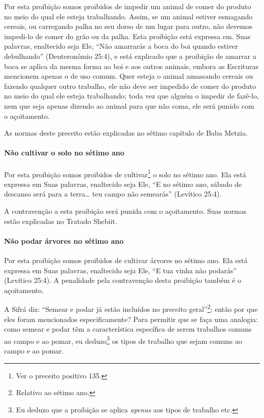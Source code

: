 Por esta proibição somos proibidos de impedir um animal de comer do
produto no meio do qual ele esteja trabalhando. Assim, se um animal
estiver esmagando cereais, ou carregando palha no seu dorso de um lugar
para outro, não devemos impedi-lo de comer do grão ou da palha. Esta
proibição está expressa em. Suas palavras, enaltecido seja Ele, ``Não
amarrarás a boca do boi quando estiver debulhando'' (Deuteronômio 25:4),
e está explicado que a proibição de amarrar a boca se aplica da mesma
forma ao boi e aos outros animais, embora as Escrituras mencionem apenas
o de uso comum. Quer esteja o animal amassando cereais ou fazendo
qualquer outro trabalho, ele não deve ser impedido de comer do produto
no meio do qual ele esteja trabalhando; toda vez que alguém o impedir de
fazê-lo, nem que seja apenas dizendo ao animal para que não coma, ele
será punido com o açoitamento.

As normas deste preceito estão explicadas no sétimo capítulo de Baba Metzia.

\paragraph{Não cultivar o solo no sétimo ano}

Por esta proibição somos proibidos de cultivar\footnote{Ver o preceito positivo 135.} o
solo no sétimo ano. Ela está expressa em Suas palavras, enaltecido seja
Ele, ``E no sétimo ano, sábado de descanso será para a terra\ldots{} teu
campo não semearás'' (Levítico 25:4).

A contravenção a esta proibição será punida com o açoitamento. Suas
normas estão explicadas no Tratado Shebiit.


\paragraph{Não podar árvores no sétimo ano}

Por esta proibição somos proibidos de cultivar árvores no sétimo ano.
Ela está expressa em Suas palavras, enaltecido seja Ele, ``E tua vinha
não podarás'' (Levítico 25:4). A penalidade pela contravenção desta
proibição também é o açoitamento.

A Sifrá diz: ``Semear e podar já estão incluídos no preceito
geral''\footnote{Relativo ao sétimo ano.}; então por que eles foram mencionados
especificamente? Para permitir que se faça uma analogia: como semear e
podar têm a característica específica de serem trabalhos comuns ao
campo e ao pomar, eu deduzo\footnote{Eu deduzo que a proibição se aplica \emph{apenas} aos tipos de trabalho etc.} os tipos de trabalho
que sejam comuns ao campo e ao pomar.

